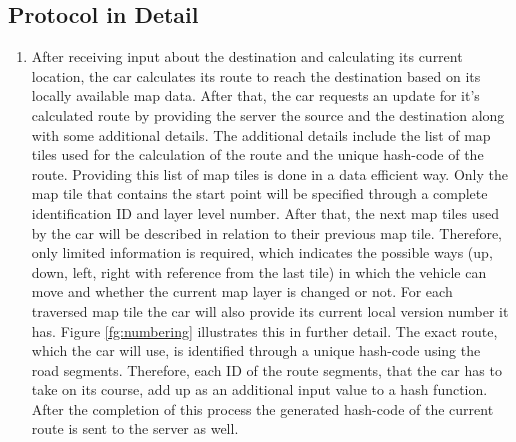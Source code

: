 \subsection{Protocol in Detail}
\begin{enumerate}
\item After receiving input about the destination and calculating its current location, the car calculates its route to reach the destination based on its locally available map data. After that, the car requests an update for it's calculated route by providing the server the source and the destination along with some additional details. The additional details include the list of map tiles used for the calculation of the route and the unique hash-code of the route. Providing this list of map tiles is done in a data efficient way. Only the map tile that contains the start point will be specified through a complete identification ID and layer level number. After that, the next map tiles used by the car will be described in relation to their previous map tile. Therefore, only limited information is required, which indicates the possible ways (up, down, left, right with reference from the last tile) in which the vehicle can move and whether the current map layer is changed or not. For each traversed map tile the car will also provide its current local version number it has. Figure \ref{fg:numbering} illustrates this in further detail. The exact route, which the car will use, is identified through a unique hash-code using the road segments. Therefore, each ID of the route segments, that the car has to take on its course, add up as an additional input value to a hash function. After the completion of this process the generated hash-code of the current route is sent to the server as well.


\end{enumerate}
